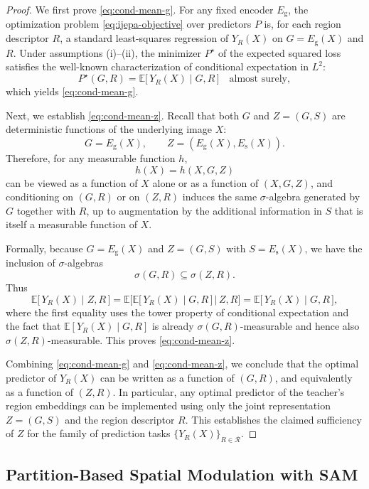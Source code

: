 \documentclass[12pt]{article}
\begin{document}
\begin{proof}
We first prove \eqref{eq:cond-mean-g}. For any fixed encoder
\(E_{\mathrm{g}}\), the optimization problem \eqref{eq:ijepa-objective}
over predictors \(P\) is, for each region descriptor \(R\), a standard
least-squares regression of \(Y_R(X)\) on \(G = E_{\mathrm{g}}(X)\) and
\(R\). Under assumptions (i)–(ii), the minimizer \(P^\star\) of the
expected squared loss satisfies the well-known characterization of
conditional expectation in \(L^2\):
\[
P^\star(G,R)
= \mathbb{E}\big[\,Y_R(X) \mid G, R\,\big]
\quad\text{almost surely},
\]
which yields \eqref{eq:cond-mean-g}.

Next, we establish \eqref{eq:cond-mean-z}. Recall that both \(G\) and
\(Z = (G,S)\) are deterministic functions of the underlying image \(X\):
\[
G = E_{\mathrm{g}}(X), \qquad
Z = (E_{\mathrm{g}}(X), E_{\mathrm{s}}(X)).
\]
Therefore, for any measurable function \(h\),
\[
h(X) = h(X, G, Z)
\]
can be viewed as a function of \(X\) alone or as a function of
\((X,G,Z)\), and conditioning on \((G,R)\) or on \((Z,R)\) induces
the same \(\sigma\)-algebra generated by \(G\) together with \(R\), up to
augmentation by the additional information in \(S\) that is itself a
measurable function of \(X\).

Formally, because \(G = E_{\mathrm{g}}(X)\) and \(Z = (G,S)\) with
\(S = E_{\mathrm{s}}(X)\), we have the inclusion of \(\sigma\)-algebras
\[
\sigma(G,R) \subseteq \sigma(Z,R).
\]
Thus
\[
\mathbb{E}\big[\,Y_R(X) \mid Z, R\,\big]
= \mathbb{E}\big[
\mathbb{E}\big[\,Y_R(X) \mid G, R\,\big] \,\big|\, Z, R
\big]
= \mathbb{E}\big[\,Y_R(X) \mid G, R\,\big],
\]
where the first equality uses the tower property of conditional
expectation and the fact that \(\mathbb{E}[Y_R(X)\mid G,R]\) is already
\(\sigma(G,R)\)-measurable and hence also \(\sigma(Z,R)\)-measurable.
This proves \eqref{eq:cond-mean-z}.

Combining \eqref{eq:cond-mean-g} and \eqref{eq:cond-mean-z}, we conclude
that the optimal predictor of \(Y_R(X)\) can be written as a function of
\((G,R)\), and equivalently as a function of \((Z,R)\).
In particular, any optimal predictor of the teacher’s region embeddings
can be implemented using only the joint representation \(Z = (G,S)\) and
the region descriptor \(R\).
This establishes the claimed sufficiency of \(Z\) for the family of
prediction tasks \(\{Y_R(X)\}_{R \in \mathcal{R}}\).
\end{proof}

\subsection{Partition-Based Spatial Modulation with SAM}
\end{document}
